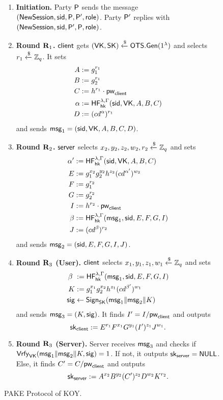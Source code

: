 \begin{figure}[tbp]
\begin{framed}
		\begin{enumerate}
			\item \textbf{Initiation.} Party $\mathsf{P}$ sends the message $(\mathsf{NewSession},\mathsf{sid},\mathsf{P},\mathsf{P}',\mathsf{role})$. Party $\mathsf{P}'$ replies with $(\mathsf{NewSession},\mathsf{sid},\mathsf{P}',\mathsf{P},\mathsf{role})$.
			\item \textbf{Round $\mathbf{R}_1$.} $\mathsf{client}$ gets $(\mathsf{VK},\mathsf{SK})\xleftarrow{\$}\mathsf{OTS}.\mathsf{Gen}(1^\lambda)$ and selects $r_1\xleftarrow{\$}\mathbb{Z}_q$. It sets
			\begin{align*}
				A &:= g_1^{r_1} \\B &:= g_2^{r_1}\\ C &:= h^{r_1}\cdot\mathsf{pw}_{\mathsf{client}}  \\ \alpha &:= \mathsf{HF}_{\mathsf{hk}}^{\lambda,\Gamma}(\mathsf{sid},\mathsf{VK},A,B,C) \\ D &:= (cd^{\alpha})^{r_1}
			\end{align*}
			and sends $\mathsf{msg}_{1} = (\mathsf{sid},\mathsf{VK},A,B,C,D)$.
			\item \textbf{Round $\mathbf{R}_2$.} $\mathsf{server}$ selects $x_2,y_2,z_2,w_2,r_2\xleftarrow{\$}\mathbb{Z}_q$ and sets
			\begin{align*}
				\alpha' &:= \mathsf{HF}_{\mathsf{hk}}^{\lambda,\Gamma}(\mathsf{sid},\mathsf{VK},A,B,C)\\
				E &:= g_1^{x_2}g_2^{y_2}h^{z_2}(cd^{\alpha'})^{w_2}\\
				F &:= g_1^{r_2}\\
				G &:= g_2^{r_2}\\
				I &:= h^{r_2}\cdot\mathsf{pw}_{\mathsf{client}}\\
				\beta &:= \mathsf{HF}_{\mathsf{hk}}^{\lambda,\Gamma}(\mathsf{msg}_{1},\mathsf{sid},E,F,G,I)\\
				J &:= (cd^{\beta})^{r_2}
			\end{align*}
			and sends $\mathsf{msg}_{2}=(\mathsf{sid},E,F,G,I,J)$.
			\item \textbf{Round $\mathbf{R}_3$ (User).} $\mathsf{client}$ selects $x_1,y_1,z_1,w_1\xleftarrow{\$}\mathbb{Z}_q$ and sets
			\begin{align*}
			 \beta\ &:= \mathsf{HF}_{\mathsf{hk}}^{\lambda,\Gamma}(\mathsf{msg}_{1},\mathsf{sid},E,F,G,I)\\
			 K &:= g_1^{x_1}g_2^{x_2}h^{z_1}(cd^{\beta'})^{w_1}\\
			 \mathsf{sig} &\gets\mathsf{Sign}_{\mathsf{SK}}(\mathsf{msg}_{1}\|\mathsf{msg}_{2}\|K)
			\end{align*}
			and sends $\mathsf{msg}_{3} = (K,\mathsf{sig})$. It finds $I' = I/\mathsf{pw}_{\mathsf{client}}$ and outputs $$\mathsf{sk}_{\mathsf{client}} := E^{r_1}F^{x_1}G^{y_1}(I')^{z_1}J^{w_1}.$$
			\item \textbf{Round $\mathbf{R}_3$ (Server).} Server receives $\mathsf{msg}_{3}$ and checks if $\mathsf{Vrfy}_{\mathsf{VK}}(\mathsf{msg}_{1}\|\mathsf{msg}_{2}\|K,\mathsf{sig})=1$. If not, it outputs $\mathsf{sk}_{\mathsf{server}}=\mathsf{NULL}$. Else, it finds $C'=C/\mathsf{pw}_{\mathsf{client}}$ and outputs 
			$$\mathsf{sk}_{\mathsf{server}} := A^{x_2}B^{y_2}(C')^{z_2}D^{w_2}K^{r_2}.$$
		\end{enumerate}
		
	\end{framed}
	\caption{PAKE Protocol of KOY.}
	\label{fig:koy}
\end{figure}


